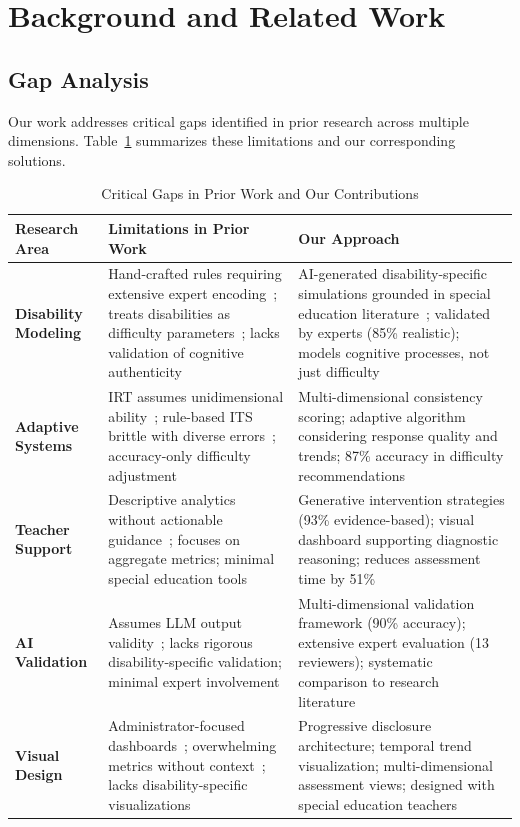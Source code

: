\documentclass[11pt]{article}
\begin{document}
\section{Background and Related Work}

\subsection{Gap Analysis}

Our work addresses critical gaps identified in prior research across multiple dimensions. Table~\ref{tab:gap-analysis} summarizes these limitations and our corresponding solutions.

\begin{table}[h]
\centering
\small
\caption{Critical Gaps in Prior Work and Our Contributions}
\label{tab:gap-analysis}
\begin{tabular}{p{3cm}p{5cm}p{5cm}}
\toprule
\textbf{Research Area} & \textbf{Limitations in Prior Work} & \textbf{Our Approach} \\
\midrule
\textbf{Disability Modeling} & 
Hand-crafted rules requiring extensive expert encoding~\cite{ref9,ref10}; treats disabilities as difficulty parameters~\cite{ref14}; lacks validation of cognitive authenticity & 
AI-generated disability-specific simulations grounded in special education literature~\cite{ref6,ref7}; validated by experts (85\% realistic); models cognitive processes, not just difficulty \\
\addlinespace
\textbf{Adaptive Systems} & 
IRT assumes unidimensional ability~\cite{ref11}; rule-based ITS brittle with diverse errors~\cite{ref12}; accuracy-only difficulty adjustment & 
Multi-dimensional consistency scoring; adaptive algorithm considering response quality and trends; 87\% accuracy in difficulty recommendations \\
\addlinespace
\textbf{Teacher Support} & 
Descriptive analytics without actionable guidance~\cite{ref24,ref25}; focuses on aggregate metrics; minimal special education tools~\cite{ref45} & 
Generative intervention strategies (93\% evidence-based); visual dashboard supporting diagnostic reasoning; reduces assessment time by 51\% \\
\addlinespace
\textbf{AI Validation} & 
Assumes LLM output validity~\cite{ref18,ref19}; lacks rigorous disability-specific validation; minimal expert involvement & 
Multi-dimensional validation framework (90\% accuracy); extensive expert evaluation (13 reviewers); systematic comparison to research literature~\cite{ref3,ref4,ref6} \\
\addlinespace
\textbf{Visual Design} & 
Administrator-focused dashboards~\cite{ref26}; overwhelming metrics without context~\cite{ref31}; lacks disability-specific visualizations & 
Progressive disclosure architecture; temporal trend visualization; multi-dimensional assessment views; designed with special education teachers \\
\bottomrule
\end{tabular}
\end{table}
\end{document}
